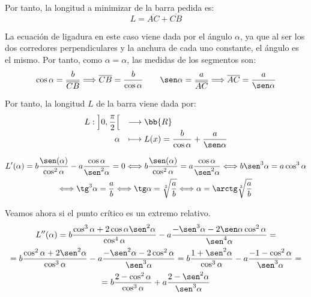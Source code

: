 \begin{ejercicio}
    Por tanto, la longitud a minimizar de la barra pedida es:
    $$L=\overline{AC} + \overline{CB}$$
    
    La ecuación de ligadura en este caso viene dada por el ángulo $\alpha$, ya que al ser los dos corredores perpendiculares y la anchura de cada uno constante, el ángulo es el mismo. Por tanto, como $\alpha = \alpha$, las medidas de los segmentos son:
    \begin{equation*}
       \cos \alpha = \frac{b}{\overline{CB}} \Longrightarrow \overline{CB} = \frac{b}{\cos \alpha} \qquad
       \sen \alpha = \frac{a}{\overline{AC}} \Longrightarrow \overline{AC} = \frac{a}{\sen \alpha}
    \end{equation*}

    Por tanto, la longitud $L$ de la barra viene dada por:
    \begin{equation*}
        \begin{array}{rl}
            L:\displaystyle  \left]0, \frac{\pi}{2}\right[ & \longrightarrow \bb{R}\\
                    \alpha & \longmapsto L(x)= \displaystyle \frac{b}{\cos \alpha} + \frac{a}{\sen \alpha}
        \end{array}
    \end{equation*}

    \begin{multline*}
        L'(\alpha) = b\frac{\sen(\alpha)}{\cos^2\alpha} - a\frac{\cos\alpha}{\sen^2\alpha} = 0 \Longleftrightarrow b\frac{\sen(\alpha)}{\cos^2\alpha} = a\frac{\cos\alpha}{\sen^2\alpha} \Longleftrightarrow b\sen^3\alpha = a\cos^3\alpha\\
        \Longleftrightarrow \tg^3\alpha = \frac{a}{b} \Longleftrightarrow \tg\alpha = \sqrt[3]{\frac{a}{b}} \Longleftrightarrow \alpha = \arctg \sqrt[3]{\frac{a}{b}}
    \end{multline*}

    Veamos ahora si el punto crítico es un extremo relativo.
    \begin{multline*}
        L''(\alpha) = b\frac{\cos^3\alpha +2\cos\alpha \sen^2\alpha}{\cos^4\alpha} - a\frac{-\sen^3\alpha -2\sen\alpha \cos^2\alpha}{\sen^4\alpha}= \\
        = b\frac{\cos^2\alpha +2 \sen^2\alpha}{\cos^3\alpha} - a\frac{-\sen^2\alpha -2 \cos^2\alpha}{\sen^3\alpha}
        = b\frac{1+\sen^2\alpha}{\cos^3\alpha} - a\frac{-1- \cos^2\alpha}{\sen^3\alpha} =\\
        = b\frac{2-\cos^2\alpha}{\cos^3\alpha} + a\frac{2- \sen^2\alpha}{\sen^3\alpha}
    \end{multline*}


\end{ejercicio}
